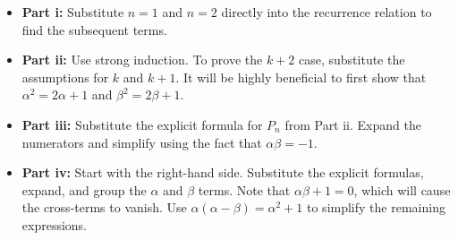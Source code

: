 \begin{hint}
\begin{itemize}[leftmargin=*]
    \item \textbf{Part i:} Substitute $n=1$ and $n=2$ directly into the recurrence relation to find the subsequent terms.
    \item \textbf{Part ii:} Use strong induction. To prove the $k+2$ case, substitute the assumptions for $k$ and $k+1$. It will be highly beneficial to first show that $\alpha^2 = 2\alpha + 1$ and $\beta^2 = 2\beta + 1$.
    \item \textbf{Part iii:} Substitute the explicit formula for $P_n$ from Part ii. Expand the numerators and simplify using the fact that $\alpha\beta = -1$.
    \item \textbf{Part iv:} Start with the right-hand side. Substitute the explicit formulas, expand, and group the $\alpha$ and $\beta$ terms. Note that $\alpha\beta + 1 = 0$, which will cause the cross-terms to vanish. Use $\alpha(\alpha - \beta) = \alpha^2 + 1$ to simplify the remaining expressions.
\end{itemize}
\end{hint}

